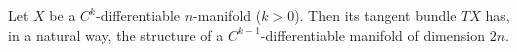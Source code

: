Let $X$ be a $C^k$-differentiable $n$-manifold ($k > 0$). Then its tangent bundle $TX$ has, in a natural way, the structure of a $C^{k-1}$-differentiable manifold of dimension $2n$.
